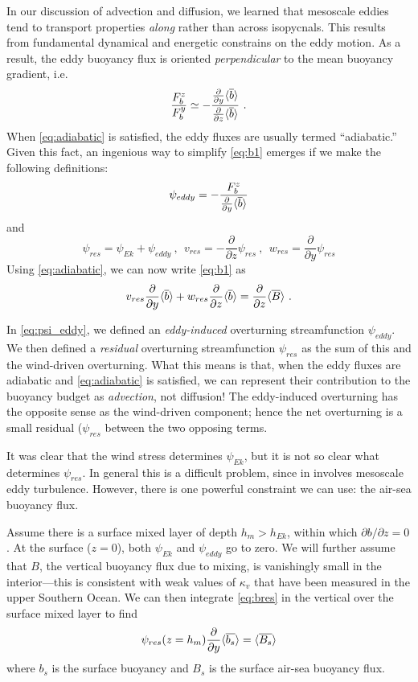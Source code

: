 \documentclass[12pt]{article}
\newcommand{\pd}[2]{ \frac{\partial #1}{\partial #2} }
\newcommand{\ab}[1]{\ensuremath{\langle #1 \rangle}}
\newcommand{\ol}{\ensuremath{\overline}}
\begin{document}
In our discussion of advection and diffusion, we learned that mesoscale eddies tend to transport properties {\em along} rather than across isopycnals. This results from fundamental dynamical and energetic constrains on the eddy motion. As a result, the eddy buoyancy flux is oriented {\em perpendicular} to the mean buoyancy gradient, i.e.
\begin{equation}
\frac{F^z_b}{F^y_b} \simeq - \frac{\pd{}{y} \ab{\ol{b}}}{\pd{}{z} \ab{\ol{b}} } \ .
\label{eq:adiabatic}
\end{equation}
When \eqref{eq:adiabatic} is satisfied, the eddy fluxes are usually termed ``adiabatic.'' Given this fact, an ingenious way to simplify \eqref{eq:b1} emerges if we make the following definitions:
\begin{equation}
\psi_{eddy} = - \frac{F^z_b}{\pd{}{y} \ab{\ol{b}}}
\label{eq:psi_eddy}
\end{equation}
and
\begin{equation}
\psi_{res} = \psi_{Ek} + \psi_{eddy} \ , \ \ v_{res} = - \pd{}{z}\psi_{res} \ , \ \ w_{res} = \pd{}{y}\psi_{res} 
\end{equation}
Using \eqref{eq:adiabatic}, we can now write \eqref{eq:b1} as
\begin{equation}
v_{res} \pd{}{y} \ab{\ol{b}} + w_{res} \pd{}{z} \ab{\ol{b}} =  \pd{}{z}\ab{\ol{B}} \ .
\label{eq:bres}
\end{equation}

In \eqref{eq:psi_eddy}, we defined an {\em eddy-induced} overturning streamfunction $\psi_{eddy}$. We then defined a {\em residual} overturning streamfunction $\psi_{res}$ as the sum of this and the wind-driven overturning. What this means is that, when the eddy fluxes are adiabatic and \eqref{eq:adiabatic} is satisfied, we can represent their contribution to the buoyancy budget as {\em advection}, not diffusion! The eddy-induced overturning has the opposite sense as the wind-driven component; hence the net overturning is a small residual ($\psi_{res}$ between the two opposing terms. 

It was clear that the wind stress determines $\psi_{Ek}$, but it is not so clear what determines $\psi_{res}$. In general this is a difficult problem, since in involves mesoscale eddy turbulence. However, there is one powerful constraint we can use: the air-sea buoyancy flux.


Assume there is a surface mixed layer of depth $h_m > h_{Ek}$, within which $\partial b / \partial z = 0$. At the surface ($z=0$), both $\psi_{Ek}$ and $\psi_{eddy}$ go to zero. We will further assume that $B$, the vertical buoyancy flux due to mixing, is vanishingly small in the interior---this is consistent with weak values of $\kappa_v$ that have been measured in the upper Southern Ocean. We can then integrate \eqref{eq:bres} in the vertical over the surface mixed layer to find
\begin{equation}
\psi_{res}(z=h_m) \pd{}{y} \ab{\ol{b_s}} = \ab{\ol{B_s}}
\label{eq:psi}
\end{equation}
where $b_s$ is the surface buoyancy and $B_s$ is the surface air-sea buoyancy flux.
\end{document}
